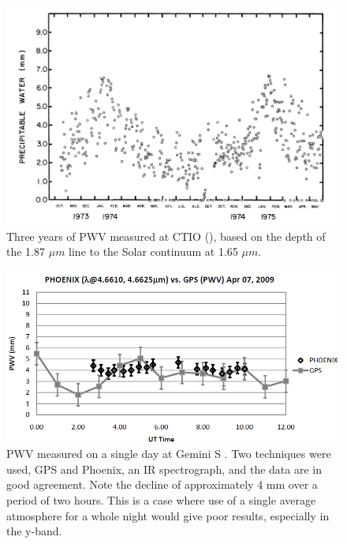 \documentclass[12pt,preprint]{aastex}
\begin{document}
\begin{figure}[htbp]
\includegraphics[width=6in]{AtmoFigs/CTIO_PWV}
\caption{ {Three years of PWV measured at CTIO (\citep{Hansen1975}), based on the depth of the 1.87 $\mu m$ line to the
Solar continuum at 1.65 $\mu m$}.
\label{fig:CTIO_PWV} }
\end{figure}

\begin{figure}[htbp]
\includegraphics[width=6in]{AtmoFigs/GeminiPWV}
\caption{ {PWV measured on a single day at Gemini S \citep{Radomski2010}.  Two
techniques were used, GPS and Phoenix, an IR spectrograph, and the
data are in good agreement.  Note the decline of approximately 4 mm
over a period of two hours.  This is a case where use of a single
average atmosphere for a whole night would give poor results,
especially in the y-band.}
\label{fig:CTIO_PWV} }
\end{figure}
\end{document}
